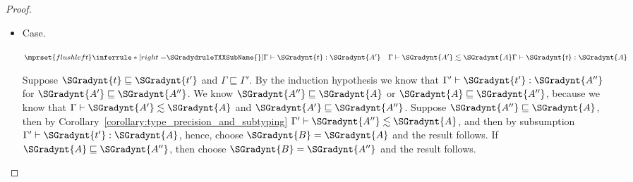 \begin{proof}
\begin{itemize}
  \item[] Case.\ \\ 
    \begin{center}
      \begin{math}
        $$\mprset{flushleft}
        \inferrule* [right=$\SGradydruleTXXSubName{}$] {
            \Gamma  \vdash  \SGradynt{t}  :  \SGradynt{A'}   \quad   \Gamma  \vdash  \SGradynt{A'}  \lesssim  \SGradynt{A}  
        }{ \Gamma  \vdash  \SGradynt{t}  :  \SGradynt{A} }
      \end{math}
    \end{center}
    Suppose $ \SGradynt{t}  \sqsubseteq  \SGradynt{t'} $ and $ \Gamma  \sqsubseteq  \Gamma' $.
    By the induction hypothesis we know that $ \Gamma'  \vdash  \SGradynt{t'}  :  \SGradynt{A''} $ for $ \SGradynt{A'}  \sqsubseteq  \SGradynt{A''} $.
    We know $ \SGradynt{A''}  \sqsubseteq  \SGradynt{A} $ or $ \SGradynt{A}  \sqsubseteq  \SGradynt{A''} $, because we know that $ \Gamma  \vdash  \SGradynt{A'}  \lesssim  \SGradynt{A} $
    and $ \SGradynt{A'}  \sqsubseteq  \SGradynt{A''} $.   Suppose $ \SGradynt{A''}  \sqsubseteq  \SGradynt{A} $, then by Corollary~\ref{corollary:type_precision_and_subtyping}
    $ \Gamma'  \vdash  \SGradynt{A''}  \lesssim  \SGradynt{A} $, and then by subsumption $ \Gamma'  \vdash  \SGradynt{t'}  :  \SGradynt{A} $, hence, choose $\SGradynt{B} = \SGradynt{A}$
    and the result follows.  If $ \SGradynt{A}  \sqsubseteq  \SGradynt{A''} $, then choose $\SGradynt{B} = \SGradynt{A''}$ and the result follows.


\end{itemize}
\end{proof}
